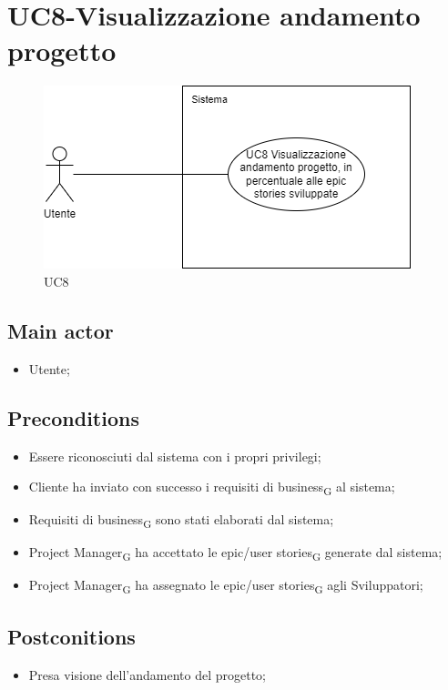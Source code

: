 \documentclass{article}
\begin{document}
\section{UC8-Visualizzazione andamento progetto}
    \begin{figure}[h]
      \centering
      \includegraphics{./imgUML/UC8.png}
        \caption{UC8}
      \label{fig:UC8}
    \end{figure}
    
    \subsection*{Main actor}
        \begin{itemize}
            \item Utente; 
        \end{itemize}
        
    \subsection*{Preconditions}
        \begin{itemize}
            \item Essere riconosciuti dal sistema con i propri privilegi;
            \item Cliente ha inviato con successo i requisiti di business\textsubscript{G} al sistema;
            \item Requisiti di business\textsubscript{G} sono stati elaborati dal sistema;
            \item Project Manager\textsubscript{G} ha accettato le epic/user stories\textsubscript{G} generate dal sistema;
            \item Project Manager\textsubscript{G} ha assegnato le epic/user stories\textsubscript{G} agli Sviluppatori;
        \end{itemize}
        
    \subsection*{Postconitions}
        \begin{itemize}
            \item Presa visione dell'andamento del progetto;
        \end{itemize}
        
\end{document}
